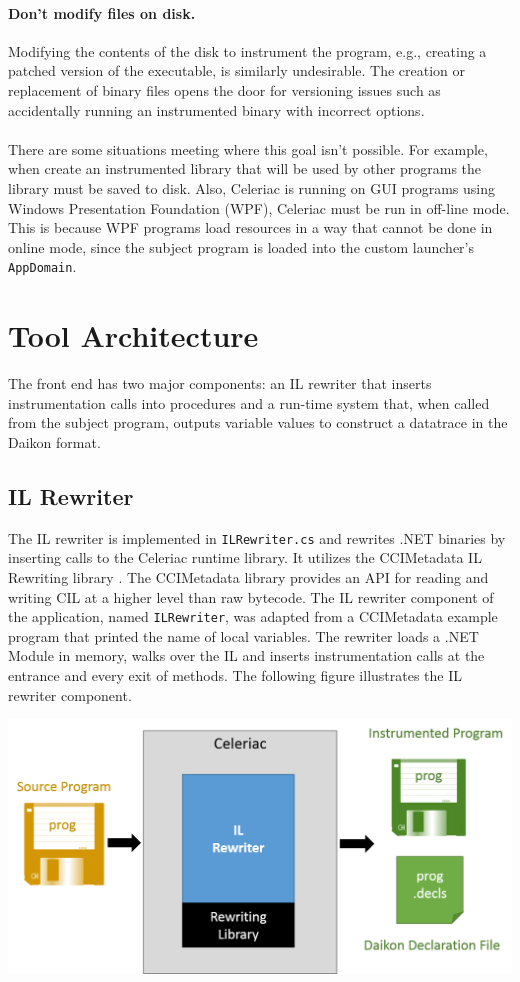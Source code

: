 \documentclass{article}
\begin{document}
\paragraph{Don't modify files on disk.}
Modifying the contents of the disk to instrument the program, e.g., creating a patched version of the executable, is similarly undesirable. The creation or replacement of binary files opens the door for versioning issues such as accidentally running an instrumented binary with incorrect options.
\\ \\
There are some situations meeting where this goal isn't possible. For example, when create an instrumented library that will be used by other programs the library must be saved to disk. Also, Celeriac is running on GUI programs using Windows Presentation Foundation (WPF), Celeriac must be run in off-line mode. This is because WPF programs load resources in a way that cannot be done in online mode, since the subject program is loaded into the custom launcher's \texttt{AppDomain}.

\section{Tool Architecture}
The front end has two major components: an IL rewriter that inserts instrumentation calls into procedures and a run-time system that, when called from the subject program, outputs variable values to construct a datatrace in the Daikon format.

\subsection{IL Rewriter}
The IL rewriter is implemented in \texttt{ILRewriter.cs} and rewrites .NET binaries by inserting calls to the Celeriac runtime library. It utilizes the CCIMetadata IL Rewriting library \cite{CCI}. The CCIMetadata library provides an API for reading and writing CIL at a higher level than raw bytecode. The IL rewriter component of the application, named \texttt{ILRewriter}, was adapted from a CCIMetadata example program that printed the name of local variables. The rewriter loads a .NET Module in memory, walks over the IL and inserts instrumentation calls at the entrance and every exit of methods. The following figure illustrates the IL rewriter component.

\begin{center}
\includegraphics[scale=.7]{Arch1}
\end{center} 
\end{document}
